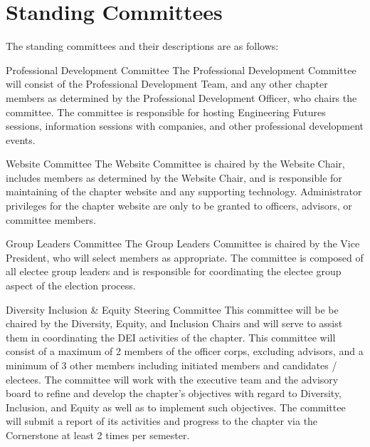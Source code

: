 \section{Standing Committees}\label{sec:standingCommittees} The standing committees and their descriptions are as follows:
\begin{enumsubsection}
	\item{Professional Development Committee} The Professional Development Committee will consist of the Professional Development Team, and any other chapter members as determined by the Professional Development Officer, who chairs the committee. The committee is responsible for hosting Engineering Futures sessions, information sessions with companies, and other professional development events.
	\item{Website Committee} The Website Committee is chaired by the Website Chair, includes members as determined by the Website Chair, and is responsible for maintaining of the chapter website and any supporting technology. Administrator privileges for the chapter website are only to be granted to officers, advisors, or committee members.
	\item{Group Leaders Committee} The Group Leaders Committee is chaired by the Vice President, who will select members as appropriate. The committee is composed of all electee group leaders and is responsible for coordinating the electee group aspect of the election process.
  \item{Diversity Inclusion \& Equity Steering Committee} This committee will be be chaired by the Diversity, Equity, and Inclusion Chairs and will serve to assist them in coordinating the DEI activities of the chapter. This committee will consist of a maximum of 2 members of the officer corps, excluding advisors, and a minimum of 3 other members including initiated members and candidates / electees. The committee will work with the executive team and the advisory board to refine and develop the chapter's objectives with regard to Diversity, Inclusion, and Equity as well as to implement such objectives. The committee will submit a report of its activities and progress to the chapter via the Cornerstone at least 2 times per semester.
\end{enumsubsection}

